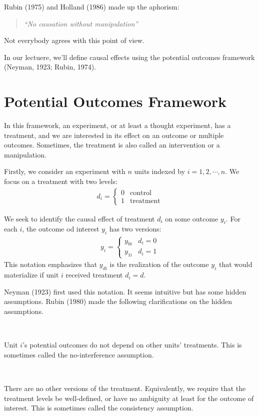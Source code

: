 Rubin (1975\cite{rubin1975bayesian}) and Holland (1986\cite{holland1986statistics}) made up the aphorism\cite{ding2023causalinference}:
\begin{quote}
  \textit{``No causation without manipulation''}
\end{quote}
Not everybody agrees with this point of view.

In our lectuere, we'll define causal effects using the potential outcomes framework
(Neyman, 1923\cite{neyman1923experiment}; Rubin, 1974\cite{rubin1974estimating}).


\section{Potential Outcomes Framework}

In this framework, an experiment, or at least a thought experiment, 
has a treatment, and we are interested in its effect on an outcome 
or multiple outcomes. Sometimes, the treatment is also called an
intervention or a manipulation.

Firstly, we consider an experiment with $n$ units indexed by $i=1, 2, \cdots, n$.
We focus on a treatment with two levels:
\begin{gather*}
  d_i = \left\{\begin{matrix}
    0 & \text{control}\\
    1 & \text{treatment}
  \end{matrix} \right.
\end{gather*}

We seek to identify the causal effect of treatment $d_i$ on some outcome $y_i$.
For each $i$, the outcome od interest $y_i$ has two versions:
\begin{gather*}
  y_i = \left\{\begin{matrix}
    y_{0i} & d_i=0\\
    y_{1i} & d_i=1
  \end{matrix} \right.
\end{gather*}
This notation emphasizes that $y_{di}$ is the realization of the outcome $y_i$ that would materialize if unit $i$
received treatment $d_i = d$.

Neyman (1923\cite{neyman1923experiment}) first used this notation. It seems intuitive but has some hidden
assumptions. Rubin (1980\cite{rubin1980comment}) made the following clarifications on the hidden assumptions.
\begin{assumption}[No interference]\label{assumption:no_interference}
  \

  Unit $i$'s potential outcomes do not depend on other units' treatments. 
  This is sometimes called the no-interference assumption.
\end{assumption}
\begin{assumption}[Consistency]\label{assumption:consistency}
  \

  There are no other versions of the treatment. 
  Equivalently, we require that the treatment levels be well-defined, 
  or have no ambiguity at least for the outcome of interest. 
  This is sometimes called the consistency assumption.
\end{assumption}

